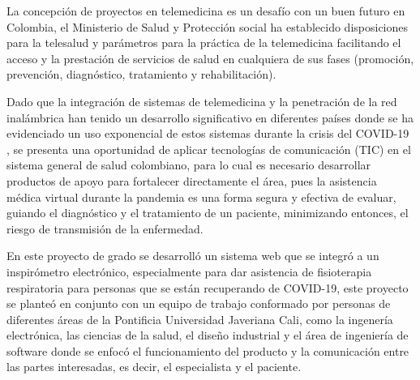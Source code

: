 \documentclass[12pt]{article}
\begin{document}
La concepci\'on de proyectos en telemedicina es un desaf\'io con un buen futuro en Colombia,  el Ministerio de Salud y Protecci\'on social ha establecido disposiciones para la telesalud y par\'ametros para la pr\'actica de la telemedicina facilitando el acceso y la prestaci\'on de servicios de salud en cualquiera de sus fases (promoci\'on, prevenci\'on, diagn\'ostico, tratamiento y rehabilitaci\'on)\cite{8}.



Dado que la integraci\'on de sistemas de telemedicina y la penetración de la red inalámbrica han tenido un desarrollo significativo en diferentes pa\'ises donde se ha evidenciado un uso exponencial de estos sistemas durante la crisis del COVID-19 \cite{10}, se presenta una oportunidad de aplicar tecnolog\'ias de comunicaci\'on (TIC) en el sistema general de salud colombiano, para lo cual es necesario desarrollar productos de apoyo para fortalecer directamente el \'area, pues la asistencia m\'edica virtual durante la pandemia es una forma segura y efectiva de evaluar, guiando el diagn\'ostico y el tratamiento de un paciente, minimizando entonces, el riesgo de transmisi\'on de la enfermedad.

En este proyecto de grado se desarrolló un sistema web que se integró a un inspir\'ometro electr\'onico, especialmente para dar asistencia de fisioterapia respiratoria para personas que se están recuperando de COVID-19, este proyecto se planteó en conjunto con un equipo de trabajo conformado por personas de diferentes \'areas de la Pontificia Universidad Javeriana Cali, como la ingener\'ia electr\'onica, las ciencias de la salud, el dise\~{n}o industrial y el \'area de ingenier\'ia de software donde se enfocó el funcionamiento del producto y la comunicaci\'on entre las partes interesadas, es decir, el especialista y el paciente.

\end{document}
